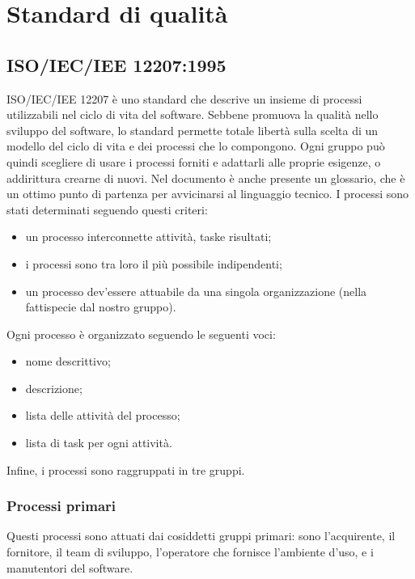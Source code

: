 \section{Standard di qualità}
	\subsection{ISO/IEC/IEE 12207:1995}
	ISO/IEC/IEE 12207 è uno standard che descrive un insieme di processi utilizzabili nel ciclo di vita del software. 
	Sebbene promuova la qualità nello sviluppo del software, lo standard permette totale libertà sulla scelta di un modello del ciclo di vita e dei processi che lo compongono. Ogni gruppo può quindi scegliere di usare i processi forniti e adattarli alle proprie esigenze, o addirittura crearne di nuovi.\newline 
	Nel documento è anche presente un glossario, che è un ottimo punto di partenza per avvicinarsi al linguaggio tecnico.\newline 
	I processi sono stati determinati seguendo questi criteri:
	\begin{itemize}
		\item un processo interconnette attività, task\glosp e risultati;
		\item i processi sono tra loro il più possibile indipendenti;
		\item un processo dev'essere attuabile da una singola organizzazione (nella fattispecie dal nostro gruppo).
	\end{itemize}
	Ogni processo è organizzato seguendo le seguenti voci:
	\begin{itemize}
		\item nome descrittivo;
		\item descrizione;
		\item lista delle attività del processo;
		\item lista di task per ogni attività.
	\end{itemize}
	Infine, i processi sono raggruppati in tre gruppi.
		\subsubsection{Processi primari}
		Questi processi sono attuati dai cosiddetti gruppi primari: sono l'acquirente, il fornitore, il team di sviluppo, l'operatore che fornisce l'ambiente d'uso, e i manutentori del software. 

